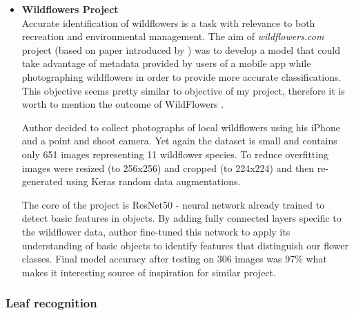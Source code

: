 \documentclass[../Main.tex]{subfiles}
\begin{document}
\begin{itemize}
        \item \textbf{Wildflowers Project} \\
        Accurate identification of wildflowers is a task with relevance to both recreation and environmental management. The aim of \textit{wildflowers.com} project (based on paper introduced by \cite{Sulc2016}) was to develop a model that could take advantage of metadata provided by users of a mobile app while photographing wildflowers in order to provide more accurate classifications. This objective seems pretty similar to objective of my project, therefore it is worth to mention the outcome of WildFlowers \cite{wildflower}. 
        
        Author decided to collect photographs of local wildflowers using his iPhone and a point and shoot camera. Yet again the dataset is small and contains only 651 images representing 11 wildflower species. To reduce overfitting images were resized (to 256x256) and cropped (to 224x224) and then re-generated using Keras random data augmentations.
        
        The core of the project is ResNet50 \cite{ResNet2015} - neural network already trained to detect basic features in objects. By adding fully connected layers specific to the wildflower data, author fine-tuned this network to apply its understanding of basic objects to identify features that distinguish our flower classes.
        Final model accuracy after testing on 306 images was 97\% what makes it interesting source of inspiration for similar project.
        
    \end{itemize}
    
    \subsubsection{Leaf recognition}
    

\biblio %
\end{document}
